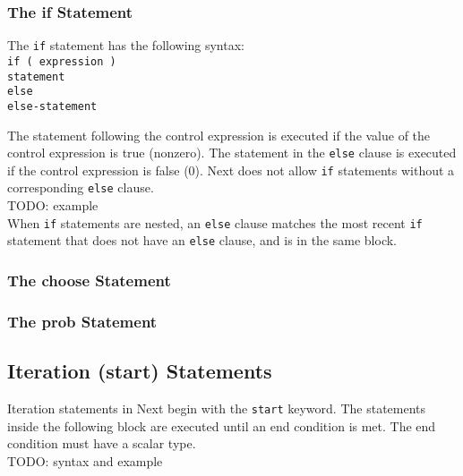 \documentclass[12pt]{article}
\begin{document}
\subsubsection{The if Statement}

The \texttt{if} statement has the following syntax: \\

\texttt{if ( expression ) \\
\indent \indent statement \\
\indent else \\
\indent \indent else-statement \\
}

\noindent The statement following the control expression is executed if the value of the control expression is true (nonzero).  The statement in the \texttt{else} clause is executed if the control expression is false (0).  Next does not allow \texttt{if} statements without a corresponding \texttt{else} clause.  \\

TODO: example \\

When \texttt{if} statements are nested, an \texttt{else} clause matches the most recent \texttt{if} statement that does not have an \texttt{else} clause, and is in the same block.

\subsubsection{The choose Statement}

\subsubsection{The prob Statement}

\subsection{Iteration (start) Statements}

Iteration statements in Next begin with the \texttt{start} keyword.  The statements inside the following block are executed until an end condition is met.  The end condition must have a scalar type. \\

TODO: syntax and example
\end{document}
